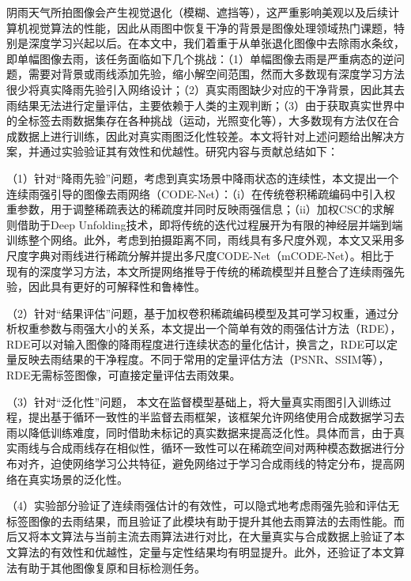

\begin{cnabstract}
    
阴雨天气所拍图像会产生视觉退化（模糊、遮挡等），这严重影响美观以及后续计算机视觉算法的性能，因此从雨图中恢复干净的背景是图像处理领域热门课题，特别是深度学习兴起以后。在本文中，我们着重于从单张退化图像中去除雨水条纹，即单幅图像去雨，该任务面临如下几个挑战：（1）单幅图像去雨是严重病态的逆问题，需要对背景或雨线添加先验，缩小解空间范围，然而大多数现有深度学习方法很少将真实降雨先验引入网络设计；（2）真实雨图缺少对应的干净背景，因此其去雨结果无法进行定量评估，主要依赖于人类的主观判断；（3）由于获取真实世界中的全标签去雨数据集存在各种挑战（运动，光照变化等），大多数现有方法仅在合成数据上进行训练，因此对真实雨图泛化性较差。本文将针对上述问题给出解决方案，并通过实验验证其有效性和优越性。研究内容与贡献总结如下：

（1）针对“降雨先验”问题，考虑到真实场景中降雨状态的连续性，本文提出一个连续雨强引导的图像去雨网络（CODE-Net）：（i）在传统卷积稀疏编码中引入权重参数，用于调整稀疏表达的稀疏度并同时反映雨强信息；（ii）加权CSC的求解则借助于Deep Unfolding技术，即将传统的迭代过程展开为有限的神经层并端到端训练整个网络。此外，考虑到拍摄距离不同，雨线具有多尺度外观，本文又采用多尺度字典对雨线进行稀疏分解并提出多尺度CODE-Net（mCODE-Net）。相比于现有的深度学习方法，本文所提网络推导于传统的稀疏模型并且整合了连续雨强先验，因此具有更好的可解释性和鲁棒性。


（2）针对“结果评估”问题，基于加权卷积稀疏编码模型及其可学习权重，通过分析权重参数与雨强大小的关系，本文提出一个简单有效的雨强估计方法（RDE），RDE可以对输入图像的降雨程度进行连续状态的量化估计，换言之，RDE可以定量反映去雨结果的干净程度。不同于常用的定量评估方法（PSNR、SSIM等），RDE无需标签图像，可直接定量评估去雨效果。

（3）针对“泛化性”问题， 本文在监督模型基础上，将大量真实雨图引入训练过程，提出基于循环一致性的半监督去雨框架，该框架允许网络使用合成数据学习去雨以降低训练难度，同时借助未标记的真实数据来提高泛化性。具体而言，由于真实雨线与合成雨线存在相似性，循环一致性可以在稀疏空间对两种模态数据进行分布对齐，迫使网络学习公共特征，避免网络过于学习合成雨线的特定分布，提高网络在真实场景的泛化性。

（4）实验部分验证了连续雨强估计的有效性，可以隐式地考虑雨强先验和评估无标签图像的去雨结果，而且验证了此模块有助于提升其他去雨算法的去雨性能。而后又将本文算法与当前主流去雨算法进行对比，在大量真实与合成数据上验证了本文算法的有效性和优越性，定量与定性结果均有明显提升。此外，还验证了本文算法有助于其他图像复原和目标检测任务。 

\end{cnabstract}

